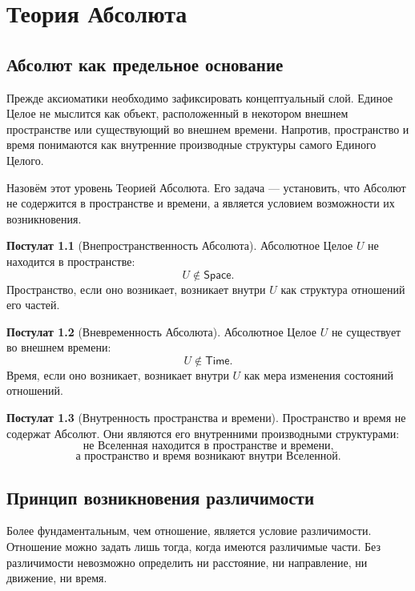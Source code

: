 \documentclass[12pt,a4paper,oneside]{book}
\theoremstyle{definition}
\newtheorem{postulate}{Постулат}[chapter]
\theoremstyle{plain}
\theoremstyle{remark}
\newcommand{\Whole}{U}
\newcommand{\Space}{\mathsf{Space}}
\newcommand{\Time}{\mathsf{Time}}
\begin{document}
\chapter{Теория Абсолюта}

\section{Абсолют как предельное основание}

Прежде аксиоматики необходимо зафиксировать концептуальный слой. Единое Целое не
мыслится как объект, расположенный в некотором внешнем пространстве или существующий
во внешнем времени. Напротив, пространство и время понимаются как внутренние
производные структуры самого Единого Целого.

Назовём этот уровень Теорией Абсолюта. Его задача --- установить, что Абсолют не
содержится в пространстве и времени, а является условием возможности их возникновения.

\begin{postulate}[Внепространственность Абсолюта]
Абсолютное Целое $\Whole$ не находится в пространстве:
\[
\Whole\notin\Space.
\]
Пространство, если оно возникает, возникает внутри $\Whole$ как структура отношений
его частей.
\end{postulate}

\begin{postulate}[Вневременность Абсолюта]
Абсолютное Целое $\Whole$ не существует во внешнем времени:
\[
\Whole\notin\Time.
\]
Время, если оно возникает, возникает внутри $\Whole$ как мера изменения состояний
отношений.
\end{postulate}

\begin{postulate}[Внутренность пространства и времени]
Пространство и время не содержат Абсолют. Они являются его внутренними производными
структурами:
\[
\boxed{\text{не Вселенная находится в пространстве и времени,}}
\]
\[
\boxed{\text{а пространство и время возникают внутри Вселенной.}}
\]
\end{postulate}

\section{Принцип возникновения различимости}

Более фундаментальным, чем отношение, является условие различимости. Отношение можно
задать лишь тогда, когда имеются различимые части. Без различимости невозможно
определить ни расстояние, ни направление, ни движение, ни время.
\end{document}
